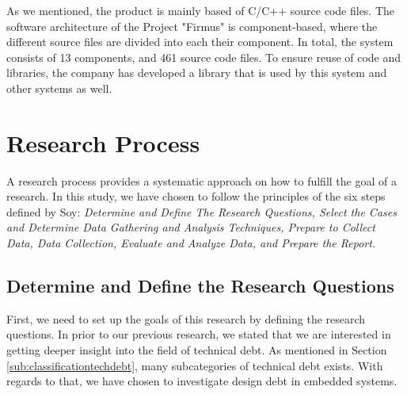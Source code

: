 As we mentioned, the product is mainly based of C/C++ source code files. The software architecture of the Project "Firmus" is component-based, where the different source files are divided into each their component. In total, the system consists of 13 components, and 461 source code files. To ensure reuse of code and libraries, the company has developed a library that is used by this system and other systems as well.




% 



\section{Research Process}
\label{sec:researchprocess}
A research process provides a systematic approach on how to fulfill the goal of a research. In this study, we have chosen to follow the principles of the six steps defined by Soy\cite{soysusan}: \textit{Determine and Define The Research Questions, Select the Cases and Determine Data Gathering and Analysis Techniques, Prepare to Collect Data, Data Collection, Evaluate and Analyze Data, and Prepare the Report}.



\subsection{Determine and Define the Research Questions} %
First, we need to set up the goals of this research by defining the research questions. In prior to our previous research\cite{forprosjekt}, we stated that we are interested in getting deeper insight into the field of technical debt. As mentioned in Section \ref{sub:classificationtechdebt}, many subcategories of technical debt exists. With regards to that, we have chosen to investigate design debt in embedded systems.

